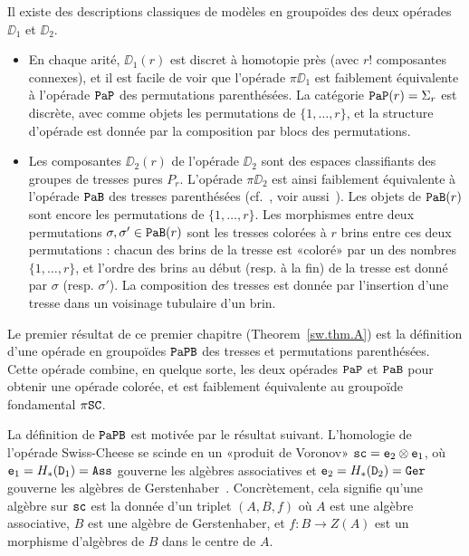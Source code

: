 Il existe des descriptions classiques de modèles en groupoïdes des deux opérades $\DD_{1}$ et $\DD_{2}$.
\begin{itemize}
\item En chaque arité, $\DD_{1}(r)$ est discret à homotopie près (avec $r!$ composantes connexes), et il est facile de voir que l'opérade
  $\pi \DD_{1}$ est faiblement équivalente à l'opérade $\PaP$ des permutations parenthésées.
  La catégorie $\PaP(r) = \Sigma_{r}$ est discrète, avec comme objets les permutations de $\{1,\dots,r\}$, et la structure d'opérade est donnée par la composition par blocs des permutations.
\item Les composantes $\DD_{2}(r)$ de l'opérade $\DD_{2}$ sont des espaces classifiants des groupes de tresses pures $P_{r}$.
  L'opérade $\pi \DD_{2}$ est ainsi faiblement équivalente à l'opérade $\PaB$ des tresses parenthésées (cf.~\cite[Chapter~I.3]{Fresse2017}, voir aussi~\cite{Fiedorowicz}).
  Les objets de $\PaB(r)$ sont encore les permutations de $\{1,\dots,r\}$.
  Les morphismes entre deux permutations $\sigma, \sigma' \in \PaB(r)$ sont les tresses colorées à $r$ brins entre ces deux permutations : chacun des brins de la tresse est «coloré» par un des nombres $\{1,\dots,r\}$, et l'ordre des brins au début (resp. à la fin) de la tresse est donné par $\sigma$ (resp. $\sigma'$).
  La composition des tresses est donnée par l'insertion d'une tresse dans un voisinage tubulaire d'un brin.
\end{itemize}

Le premier résultat de ce premier chapitre (Theorem~\ref{sw.thm.A}) est la définition d'une opérade en groupoïdes $\PaPB$ des tresses et permutations parenthésées.
Cette opérade combine, en quelque sorte, les deux opérades $\PaP$ et $\PaB$ pour obtenir une opérade colorée, et est faiblement équivalente au groupoïde fondamental $\pi \SC$.

La définition de $\PaPB$ est motivée par le résultat suivant.
L'homologie de l'opérade Swiss-Cheese se scinde en un «produit de Voronov» $\Sc = \en[2] \otimes \en[1]$, où $\en[1] = H_{*}(\DD_{1}) = \Ass$ gouverne les algèbres associatives et $\en[2] = H_{*}(\DD_{2}) = \Ger$ gouverne les algèbres de Gerstenhaber~\cite{Voronov1999}.
Concrètement, cela signifie qu'une algèbre sur $\Sc$ est la donnée d'un triplet $(A,B,f)$ où $A$ est une algèbre associative, $B$ est une algèbre de Gerstenhaber, et $f : B \to Z(A)$ est un morphisme d'algèbres de $B$ dans le centre de $A$.

